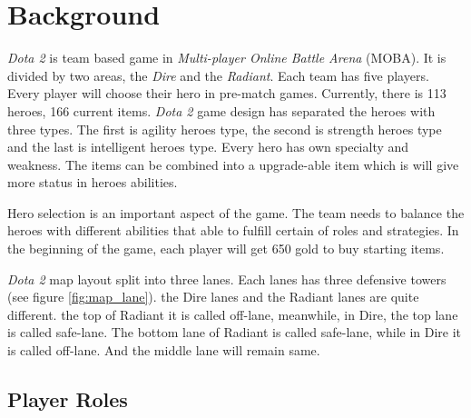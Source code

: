 \section{Background}
\label{sec:background}

\textit{Dota 2} is team based game in \textit{Multi-player Online Battle Arena} (MOBA). It is divided by two areas, the \textit{Dire} and the \textit{Radiant}. Each team has five players. Every player will choose their hero in pre-match games. Currently, there is 113 heroes, 166 current items. \textit{Dota 2} game design has separated the heroes with three types. The first is agility heroes type, the second is strength heroes type and the last is intelligent heroes type. Every hero has own specialty and weakness. The items can be combined into a upgrade-able item which is will give more status in heroes abilities.

Hero selection is an important aspect of the game. The team needs to balance the heroes with different abilities that able to fulfill certain of roles and strategies. In the beginning of the game, each player will get 650 gold to buy starting items.

\textit{Dota 2} map layout split into three lanes. Each lanes has three defensive towers (see figure \ref{fig:map_lane}). the Dire lanes and the Radiant lanes are quite different. the top of Radiant it is called off-lane, meanwhile, in Dire, the top lane is called safe-lane. The bottom lane of Radiant is called safe-lane, while in Dire it is called off-lane. And the middle lane will remain same.

\subsection{Player Roles}
\label{sec:player_roles}

